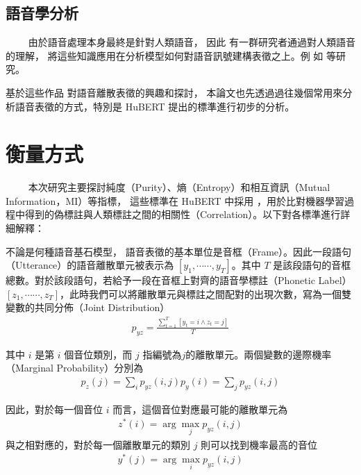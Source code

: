 \subsection{語音學分析}

　　
由於語音處理本身最終是針對人類語音，
因此
有一群研究者通過對人類語音的理解，
將這些知識應用在分析模型如何對語音訊號建構表徵之上。例
如 \cite{deseyssel22_interspeech, wells_phonetic_2022, 10097097, abdullah23_interspeech} 等研究。

        基於這些作品
對語音離散表徵的興趣和探討，  %
本論文也先透過過往幾個常用來分析語音表徵的方式，特別是
HuBERT \cite{hsu_hubert_2021-2} 提出的標準進行初步的分析。

\section{衡量方式}

　　
本次研究主要探討純度（Purity）、熵（Entropy）和相互資訊（Mutual Information，MI）等指標，
這些標準在 HuBERT 中採用 \cite{hsu_hubert_2021, hsu_hubert_2021-2}，用於比對機器學習過程中得到的偽標註與人類標註之間的相關性（Correlation）。以下對各標準進行詳細解釋：

        不論是何種語音基石模型，
語音表徵的基本單位是音框（Frame）。因此一段語句（Utterance）的語音離散單元被表示為 $[y_1, \cdots\cdots, y_T]$。其中 $T$ 是該段語句的音框總數。對於該段語句，若給予一段在音框上對齊的語音學標註（Phonetic Label） $[z_1, \cdots\cdots, z_T]$，此時我們可以將離散單元與標註之間配對的出現次數，寫為一個雙變數的共同分佈（Joint Distribution）
    \begin{align}
      p_{yz} = \frac{\sum^T_{t=1}[{y_t = i \wedge z_t = j}]}{T}
    \end{align}

其中 $i$ 是第 $i$ 個音位類別，而 $j$ 指編號為$j$的離散單元。兩個變數的邊際機率（Marginal Probability）分別為
    \begin{align}
        p_z(j)=\sum_i{p_{yz}(i, j)}
    p_y(i)=\sum_j{p_{yz}(i, j)}
\end{align}

因此，對於每一個音位 $i$ 而言，這個音位對應最可能的離散單元為
    \begin{align}
      z^\ast(i) = \arg\max_j p_{yz}(i, j)
    \end{align}
與之相對應的，對於每一個離散單元的類別 $j$ 則可以找到機率最高的音位
    \begin{align}
      y^\ast(j) = \arg\max_i p_{yz}(i,j)
    \end{align}

